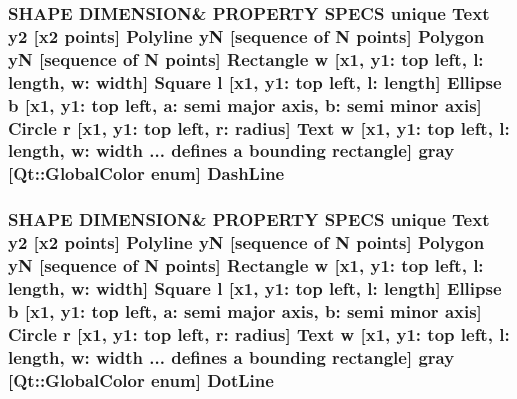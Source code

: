 \subsubsection[{\texorpdfstring{Dash\+Line}{DashLine}}]{\setlength{\rightskip}{0pt plus 5cm}S\+H\+A\+PE D\+I\+M\+E\+N\+S\+I\+ON\& P\+R\+O\+P\+E\+R\+TY S\+P\+E\+CS unique {\bf Text} {\bf y2} \mbox{[}{\bf x2} points\mbox{]} {\bf Polyline} yN \mbox{[}sequence of N points\mbox{]} {\bf Polygon} yN \mbox{[}sequence of N points\mbox{]} {\bf Rectangle} w \mbox{[}{\bf x1}, y1\+: top left, l\+: length, w\+: width\mbox{]} {\bf Square} {\bf l} \mbox{[}{\bf x1}, y1\+: top left, l\+: length\mbox{]} {\bf Ellipse} b \mbox{[}{\bf x1}, y1\+: top left, a\+: semi major axis, b\+: semi minor axis\mbox{]} {\bf Circle} r \mbox{[}{\bf x1}, y1\+: top left, r\+: radius\mbox{]} {\bf Text} w \mbox{[}{\bf x1}, y1\+: top left, l\+: length, w\+: width ... defines {\bf a} bounding rectangle\mbox{]} gray \mbox{[}Qt\+::\+Global\+Color enum\mbox{]} Dash\+Line}\hypertarget{shape__input__file__specs_8txt_a441e15ffcd042d37c9239405240cda6a}{}\label{shape__input__file__specs_8txt_a441e15ffcd042d37c9239405240cda6a}
\subsubsection[{\texorpdfstring{Dot\+Line}{DotLine}}]{\setlength{\rightskip}{0pt plus 5cm}S\+H\+A\+PE D\+I\+M\+E\+N\+S\+I\+ON\& P\+R\+O\+P\+E\+R\+TY S\+P\+E\+CS unique {\bf Text} {\bf y2} \mbox{[}{\bf x2} points\mbox{]} {\bf Polyline} yN \mbox{[}sequence of N points\mbox{]} {\bf Polygon} yN \mbox{[}sequence of N points\mbox{]} {\bf Rectangle} w \mbox{[}{\bf x1}, y1\+: top left, l\+: length, w\+: width\mbox{]} {\bf Square} {\bf l} \mbox{[}{\bf x1}, y1\+: top left, l\+: length\mbox{]} {\bf Ellipse} b \mbox{[}{\bf x1}, y1\+: top left, a\+: semi major axis, b\+: semi minor axis\mbox{]} {\bf Circle} r \mbox{[}{\bf x1}, y1\+: top left, r\+: radius\mbox{]} {\bf Text} w \mbox{[}{\bf x1}, y1\+: top left, l\+: length, w\+: width ... defines {\bf a} bounding rectangle\mbox{]} gray \mbox{[}Qt\+::\+Global\+Color enum\mbox{]} Dot\+Line}\hypertarget{shape__input__file__specs_8txt_a9dd44362ce176c29c65b56add41cf11a}{}\label{shape__input__file__specs_8txt_a9dd44362ce176c29c65b56add41cf11a}
